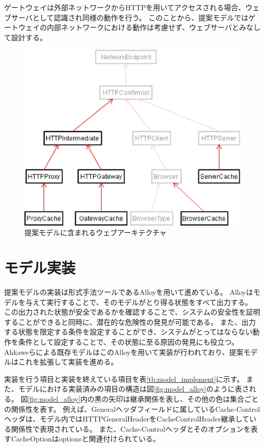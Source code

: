\documentclass{css}
\begin{document}
ゲートウェイは外部ネットワークからHTTPを用いてアクセスされる場合、ウェブサーバとして認識され同様の動作を行う。
このことから、提案モデルではゲートウェイの内部ネットワークにおける動作は考慮せず、ウェブサーバとみなして設計する。

\begin{figure}[htb]
\centering
\includegraphics[width=0.8\hsize]{model_archi.eps}
\caption{提案モデルに含まれるウェブアーキテクチャ}
\label{fig:model_header}
\end{figure}

\section{モデル実装}
提案モデルの実装は形式手法ツールであるAlloyを用いて進めている。
\color{red}
Alloyはモデルを与えて実行することで、そのモデルがとり得る状態をすべて出力する。
この出力された状態が安全であるかを確認することで、システムの安全性を証明することができると同時に、潜在的な危険性の発見が可能である。
また、出力する状態を限定する条件を設定することができ、システムがとってはならない動作を条件として設定することで、その状態に至る原因の発見にも役立つ。
\color{black}
Ahkaweらによる既存モデル\cite{webmodel}はこのAlloyを用いて実装が行われており、提案モデルはこれを拡張して実装を進める。

\color{red}
実装を行う項目と実装を終えている項目を表\ref{tb:model_implement}に示す。
また、モデルにおける実装済みの項目の構造は図\ref{fig:model_alloy}のように表される。
図\ref{fig:model_alloy}内の黒の矢印は継承関係を表し、その他の色は集合ごとの関係性を表す。
例えば、Generalヘッダフィールドに属しているCache-Controlヘッダは、モデル内ではHTTPGeneralHeaderをCacheControlHeader継承している関係性で表現されている。
また、Cache-Controlヘッダとそのオプションを表すCacheOptionはoptionsと関連付けられている。
\end{document}
